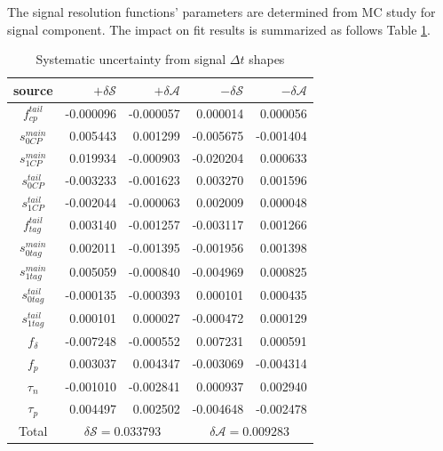 The signal resolution functions' parameters are determined from MC study for signal component. The impact on fit results is summarized as follows Table \ref{tab:sy_sigt}.
\begin{table}[htpb]
	\begin{minipage}[b]{1.0\linewidth}
		\centering
		\caption{Systematic uncertainty from signal $\Delta t$ shapes}
		\label{tab:sy_sigt}
		\begin{tabular}{c r r r r}
			\hline
			source & $+\delta \mathcal{S}$ & $+\delta \mathcal{A}$ & $-\delta \mathcal{S}$ &  $-\delta \mathcal{A}$\\
			\hline
			$f_{cp}^{tail}$ & -0.000096 & -0.000057
			& 0.000014
			& 0.000056
			\\
			$s_{0CP}^{main}$& 0.005443
			& 0.001299
			& -0.005675
			& -0.001404
			\\
			$s_{1CP}^{main}$ & 0.019934
			& -0.000903
			& -0.020204
			& 0.000633
			\\
			$s_{0CP}^{tail}$ &  -0.003233
			& -0.001623
			& 0.003270
			& 0.001596
			\\
			$s_{1CP}^{tail}$ & -0.002044	
			&-0.000063	
			&0.002009	
			&0.000048
			\\
			$f_{tag}^{tail}$ & 0.003140
			& -0.001257
			& -0.003117
			& 0.001266
			\\
			$s_{0tag}^{main}$&  0.002011
			& -0.001395
			& -0.001956
			& 0.001398
			\\
			$s_{1tag}^{main}$ & 0.005059
			& -0.000840
			& -0.004969
			& 0.000825
			\\
			$s_{0tag}^{tail}$ &  -0.000135
			& -0.000393
			& 0.000101 & 0.000435
			\\
			$s_{1tag}^{tail}$  & 0.000101 & 0.000027 &  -0.000472
			& 0.000129
			\\
			$f_{\delta}$ & -0.007248
			& -0.000552
			& 0.007231
			& 0.000591
			\\
			$f_p$ &  0.003037
			& 0.004347
			& -0.003069
			& -0.004314
			\\
			$\tau_n$ & -0.001010 & -0.002841
			& 0.000937
			& 0.002940
			\\
			$\tau_p$ &  0.004497
			& 0.002502
			& -0.004648
			& -0.002478
			\\
			\hline
			Total &
			\multicolumn{2}{c}{$\delta \mathcal{S}=0.033793$} &
			\multicolumn{2}{c}{$\delta \mathcal{A}=0.009283$}\\
			\hline
		\end{tabular}
	\end{minipage}
\end{table}

